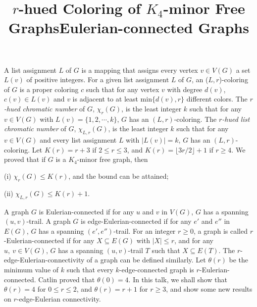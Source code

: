 \documentclass{article}
\begin{document}
\vspace{.25in}

\title{$r$-hued Coloring of $K_4$-minor Free Graphs}
\endtitle
A list assignment $L$ of $G$ is a mapping that assigns every
vertex $v\in V(G)$ a set $L(v)$ of positive integers. For a given list
assignment $L$ of $G$, an ($L,r$)-coloring of $G$ is a proper coloring $c$
such that for any vertex $v$ with degree $d(v)$, $c(v)\in L(v)$ and $v$ is
adjacent to at least min$\{d(v),r\}$ different colors. The {\it $r$-hued
chromatic number} of $G$, $\chi_{r}(G)$, is the least integer $k$ such that
for any $v \in V(G)$ with $L(v) = \{1,2,\cdots,k\}$, $G$ has an
$(L,r)$-coloring. The {\it $r$-hued list chromatic number} of $G$,
$\chi_{L,r}(G)$, is the least integer $k$ such that for any $v \in V(G)$ and
every list assignment $L$ with $|L(v)| = k$, $G$ has an $(L,r)$-coloring.
Let $K(r)=r+3$ if $2 \le r \le 3$, and  $K(r)=\lfloor 3r/2\rfloor+1$ if
$r\ge 4$. We proved that if $G$ is a $K_4$-minor free graph, then

(i) $\chi_r(G) \le K(r)$, and the bound can be attained;

(ii) $\chi_{L,r}(G) \le K(r)+1$.


\vspace{.25in}

\title{Eulerian-connected Graphs}
\endtitle
A graph $G$ is Eulerian-connected if for any $u$ and $v$ in
$V(G)$, $G$ has a spanning $(u,v)$-trail.
A graph $G$ is edge-Eulerian-connected if for any $e'$ and $e''$ in $E(G)$,
$G$ has a spanning $(e',e'')$-trail.
For an integer $r\ge 0$, a graph is called $r$-Eulerian-connected if for any
$X\subseteq E(G)$ with $|X|\le r$,
and for any $u,\ v \in V(G)$, 
$G$ has a spanning $(u,v)$-trail $T$ such that $X\subseteq E(T)$. The
$r$-edge-Eulerian-connectivity of a graph can be defined similarly.
 Let $\theta (r)$ be the minimum value of $k$ such
that every $k$-edge-connected graph is $r$-Eulerian-connected.
 Catlin proved that $\theta(0)=4$. In this talk, we shall show that
$\theta(r)=4$ for $0\le r\le 2$, and $\theta(r)=r+1$ for $r\ge 3$, and show
 some new results on $r$-edge-Eulerian connectivity. 

\vspace{.25in}
\end{document}
